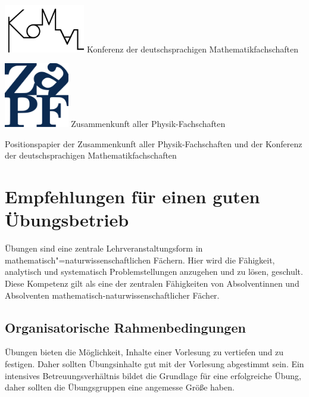 \documentclass[DIV=calc]{scrartcl}
\begin{document}
\begin{minipage}{120pt}
\vspace{-2cm}
\includegraphics[width=100pt]{komaLogo.png}
\centering
\small Konferenz der deutschsprachigen Mathematikfachschaften
\end{minipage}
\hfill
\begin{minipage}{120pt}
\vspace{-2cm}
\includegraphics[width=80pt]{zapf_logo.pdf}
\centering
\small Zusammenkunft aller Physik-Fachschaften
\end{minipage}
\begin{center}
\huge{Positionspapier der Zusammenkunft aller Physik-Fachschaften und der Konferenz der deutschsprachigen Mathematikfachschaften} \\
\normalsize
\end{center}

\section*{Empfehlungen für einen guten Übungsbetrieb}
Übungen sind eine zentrale Lehrveranstaltungsform in mathematisch"=naturwissenschaftlichen Fächern. Hier wird die Fähigkeit, analytisch und systematisch Problemstellungen anzugehen und zu lösen, geschult. Diese Kompetenz gilt als eine der zentralen Fähigkeiten von Absolventinnen und Absolventen mathematisch-naturwissenschaftlicher Fächer.

\subsection*{Organisatorische Rahmenbedingungen}
Übungen bieten die Möglichkeit, Inhalte einer Vorlesung zu vertiefen und zu festigen. Daher sollten Übungsinhalte gut mit der Vorlesung abgestimmt sein. Ein intensives Betreuungsverhältnis bildet die Grundlage für eine erfolgreiche Übung, daher sollten die Übungsgruppen eine angemesse Größe haben.
\end{document}
